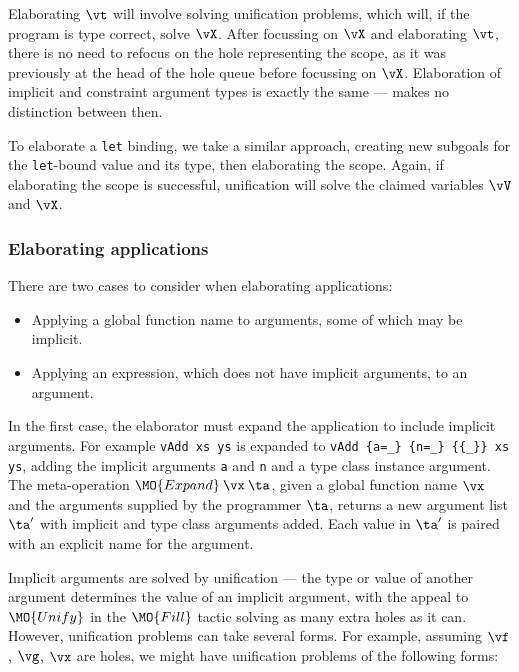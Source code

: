 Elaborating $\vt$ will involve solving unification problems, which will, if the
program is type correct, solve $\vX$. After focussing on $\vX$ and elaborating
$\vt$, there is no need to refocus on the hole representing the scope, as it was
previously at the head of the hole queue before focussing on $\vX$.
Elaboration of implicit and constraint
argument types is exactly the same --- \TT{} makes no distinction between then.

To elaborate a \texttt{let} binding, we take a similar approach, creating new subgoals
for the \texttt{let}-bound value and its type, then elaborating the scope. Again,
if elaborating the scope is successful, unification will solve the claimed variables
$\vV$ and $\vX$.

\subsubsection{Elaborating applications}

There are two cases to consider when elaborating applications:

\begin{itemize}
\item Applying a global function name to arguments, some of which may be implicit.
\item Applying an expression, which does not have implicit arguments, to an argument.
\end{itemize}

In the first case, the elaborator must expand the application to include implicit arguments.
For example \texttt{vAdd xs ys} is expanded to
\texttt{vAdd \{a=\_\} \{n=\_\} \{\{\_\}\} xs ys}, adding the implicit arguments
\texttt{a} and \texttt{n} and a type class instance argument. The meta-operation
$\MO{Expand}\:\vx\:\ta$, given a global function name $\vx$ and the
arguments supplied by the programmer $\ta$, returns a new argument list
$\ta'$ with implicit and type class arguments added. Each value in
$\ta'$ is paired with an explicit name for the argument.

Implicit arguments are solved by unification
--- the type or value of another argument determines the value of an implicit argument,
with the appeal to $\MO{Unify}$ in the $\MO{Fill}$ tactic solving as many extra holes
as it can. However, unification problems can take several forms. For example, assuming
$\vf$, $\vg$, $\vx$ are holes, we might have unification problems of the following
forms:

